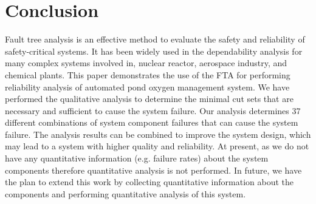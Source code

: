 \documentclass[10pt]{llncs}
\begin{document}
\section{Conclusion}
\label{sec:5}
Fault tree analysis is an effective method to evaluate the safety and reliability of safety-critical systems. It has been widely used in the dependability analysis for many complex systems involved in, nuclear reactor, aerospace industry, and chemical plants. This paper demonstrates the use of the FTA for performing reliability analysis of automated pond oxygen management system. We have performed the qualitative analysis to determine the minimal cut sets that are necessary and sufficient to cause the system failure. Our analysis determines 37 different combinations of system component failures that can cause the system failure. The analysis results can be combined to improve the system design, which may lead to a system with higher quality and reliability. At present, as we do not have any quantitative information (e.g. failure rates) about the system components therefore quantitative analysis is not performed. In future, we have the plan to extend this work by collecting quantitative information about the components and performing quantitative analysis of this system.



\end{document}

